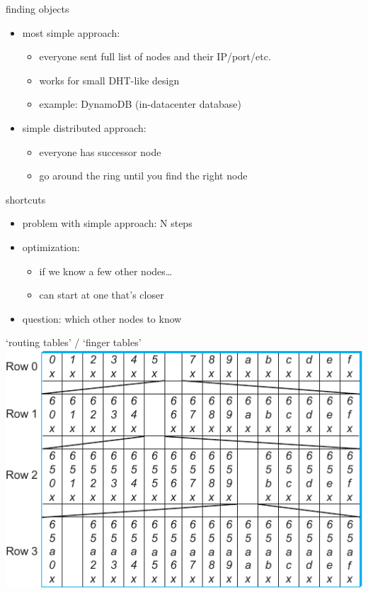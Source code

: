 \begin{frame}{finding objects}
    \begin{itemize}
    \item most simple approach:
        \begin{itemize}
        \item everyone sent full list of nodes and their IP/port/etc.
        \item works for small DHT-like design
        \item example: DynamoDB (in-datacenter database)
        \end{itemize}
    \item simple distributed approach:
        \begin{itemize}
        \item everyone has successor node
        \item go around the ring until you find the right node
        \end{itemize}
    \end{itemize}
\end{frame}


\begin{frame}{shortcuts}
    \begin{itemize}
    \item problem with simple approach: N steps
    \item optimization:
        \begin{itemize}
        \item if we know a few other nodes\ldots
        \item can start at one that's closer
        \end{itemize}
    \item question: which other nodes to know
    \end{itemize}
\end{frame}

\begin{frame}{`routing tables' / `finger tables'}
\includegraphics[width=\textwidth]{../p2p/sysapp-fig242}
\end{frame}

